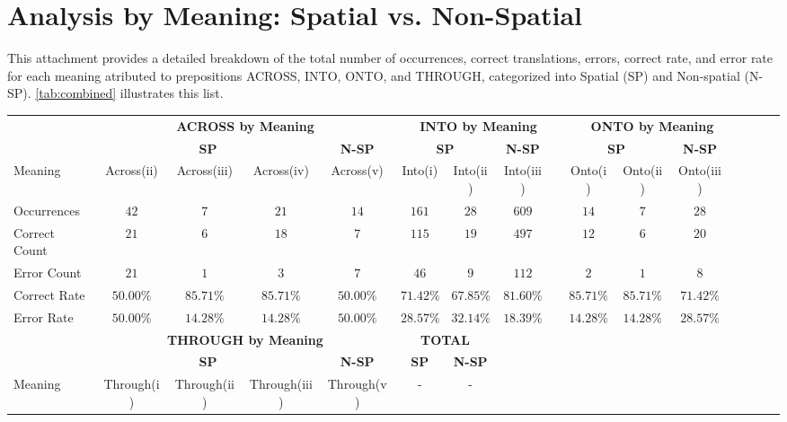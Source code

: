 \section*{Analysis by Meaning: Spatial vs. Non-Spatial}
\label{att2}

This attachment provides a detailed breakdown of the total number of occurrences, correct translations, errors, correct rate, and error rate for each meaning atributed to prepositions ACROSS, INTO, ONTO, and THROUGH, categorized into Spatial (SP) and Non-spatial (N-SP). \ref{tab:combined} illustrates this list.


\begin{landscape}
\centering
\begin{longtable}{lccccccccccccccc}
\toprule
& \multicolumn{4}{c}{\textbf{ACROSS by Meaning}} & \multicolumn{4}{c}{\textbf{INTO by Meaning}} & \multicolumn{4}{c}{\textbf{ONTO by Meaning}} & \\
\cmidrule(lr){1-5} \cmidrule(lr){6-9} \cmidrule(lr){10-13}
 & \multicolumn{3}{c}{\textbf{SP}} & \textbf{N-SP} & \multicolumn{2}{c}{\textbf{SP}} & \textbf{N-SP} & & \multicolumn{2}{c}{\textbf{SP}} & \textbf{N-SP} & \\
 Meaning & Across(ii) & Across(iii) & Across(iv) & Across(v) & Into(i) & Into(ii) & Into(iii) & & Onto(i) & Onto(ii) & Onto(iii) & \\
\midrule
Occurrences & $42$ & $7$ & $21$ & $14$ & $161$ & $28$ & $609$ & & $14$ & $7$ & $28$ & \\
Correct Count & $21$ & $6$ & $18$ & $7$ & $115$ & $19$ & $497$ & & $12$ & $6$ & $20$ & \\
Error Count & $21$ & $1$ & $3$ & $7$ & $46$ & $9$ & $112$ & & $2$ & $1$ & $8$ & \\
\midrule
Correct Rate & $50.00\%$ & $85.71\%$ & $85.71\%$ & $50.00\%$ & $71.42\%$ & $67.85\%$ & $81.60\%$ & & $85.71\%$ & $85.71\%$ & $71.42\%$ & \\
\midrule
Error Rate & $50.00\%$ & $14.28\%$ & $14.28\%$ & $50.00\%$ & $28.57\%$ & $32.14\%$ & $18.39\%$ & & $14.28\%$ & $14.28\%$ & $28.57\%$ & \\
\bottomrule
\toprule
& \multicolumn{4}{c}{\textbf{THROUGH by Meaning}} & \multicolumn{2}{c}{\textbf{TOTAL}} \\
\cmidrule(lr){1-5} \cmidrule(lr){6-7}
 & \multicolumn{3}{c}{\textbf{SP}} & \textbf{N-SP} & \textbf{SP} & \textbf{N-SP}\\
 Meaning & Through(i) & Through(ii) & Through(iii) & Through(v) & - & - \\
\midrule

\end{longtable}
\end{landscape}
